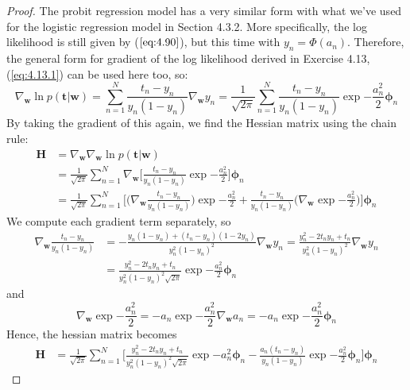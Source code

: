 \begin{proof}
    The probit regression model has a very similar form with what
    we've used for the logistic regression model in Section 4.3.2. 
    More specifically, the log likelihood is still given by ($\ref{eq:4.90}$),
    but this time with $y_n = \Phi(a_n)$. Therefore, the general form for gradient of the log 
    likelihood derived in Exercise 4.13, (\ref{eq:4.13.1}) can be used
    here too, so:
    \[
        \nabla_\mathbf{w} \ln p(\mathbf{t} | \mathbf{w}) 
        = \sum_{n=1}^{N} \frac{t_n - y_n}{y_n(1 - y_n)} \nabla_\mathbf{w} y_n
        = \frac{1}{\sqrt{2\pi}} \sum_{n=1}^{N} \frac{t_n - y_n}{y_n(1 - y_n)} 
        \exp{-\frac{a_n^2}{2}}\bm{\phi}_n
    \] 
    By taking the gradient of this again, we find the Hessian matrix
    using the chain rule:
    \begin{align*}
        \mathbf{H} 
        &= \nabla_\mathbf{w} \nabla_\mathbf{w} \ln p(\mathbf{t} | \mathbf{w}) \\
        &= \frac{1}{\sqrt{2\pi}} \sum_{n=1}^{N}
        \nabla_\mathbf{w}\bigg[\frac{t_n - y_n}{y_n(1 - y_n)}\exp{-\frac{a_n^2}{2}}\bigg]\bm{\phi}_n \\
        &= \frac{1}{\sqrt{2\pi}} \sum_{n=1}^{N} \bigg[
            \bigg(\nabla_\mathbf{w} \frac{t_n - y_n}{y_n(1 - y_n)}\bigg)
            \exp{-\frac{a_n^2}{2}} + \frac{t_n - y_n}{y_n(1 - y_n)} 
        \bigg(\nabla_\mathbf{w} \exp{-\frac{a_n^2}{2}}\bigg)\bigg]\bm{\phi}_n
    \end{align*}
    We compute each gradient term separately, so
    \begin{align*}
        \nabla_\mathbf{w} \frac{t_n - y_n}{y_n(1 - y_n)}
        &= -\frac{y_n(1 - y_n) + (t_n - y_n)(1 - 2y_n)}
        {y_n^2(1 - y_n)^2} \nabla_\mathbf{w} y_n
        = \frac{y_n^2 - 2t_ny_n + t_n}{y_n^2(1 - y_n)^2}\nabla_\mathbf{w} y_n \\
        &= \frac{y_n^2 - 2t_ny_n + t_n}{y_n^2(1 - y_n)^2\sqrt{2\pi}}\exp{-\frac{a_n^2}{2}}
        \bm{\phi}_n
    \end{align*}
    and
    \[
        \nabla_\mathbf{w} \exp{-\frac{a_n^2}{2}} 
        = -a_n\exp{-\frac{a_n^2}{2}} \nabla_\mathbf{w} a_n
        = -a_n\exp{-\frac{a_n^2}{2}} \bm{\phi}_n
    \] 
    Hence, the hessian matrix becomes
    \begin{align*}
        \mathbf{H} 
        &= \frac{1}{\sqrt{2\pi}} \sum_{n=1}^{N} \bigg[
        \frac{y_n^2 - 2t_ny_n + t_n}{y_n^2(1 - y_n)^2\sqrt{2\pi}}\exp{-a_n^2}\bm{\phi}_n
        - \frac{a_n(t_n - y_n)}{y_n(1 - y_n)}\exp{-\frac{a_n^2}{2}}\bm{\phi}_n\bigg] \bm{\phi}_n
    \end{align*}
\end{proof}

